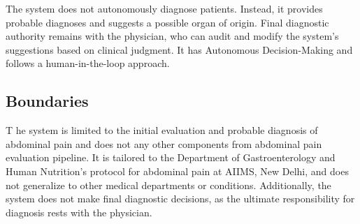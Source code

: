 \noindent The system does not autonomously diagnose patients. Instead, it provides probable diagnoses and suggests a possible organ of origin. Final diagnostic authority remains with the physician, who can audit and modify the system's suggestions based on clinical judgment. It has Autonomous Decision-Making and follows a human-in-the-loop approach.

\subsection{Boundaries}
\lettrine{T}{ }he system is limited to the initial evaluation and probable diagnosis of abdominal pain and does not any other components from abdominal pain evaluation pipeline. It is tailored to the Department of Gastroenterology and Human Nutrition's protocol for abdominal pain at AIIMS, New Delhi, and does not generalize to other medical departments or conditions. Additionally, the system does not make final diagnostic decisions, as the ultimate responsibility for diagnosis rests with the physician.